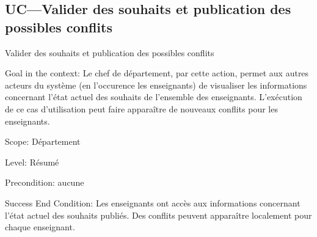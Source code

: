 \begin{ocl}
\begin{comment}
Dans ce scénario, le conflit est réglé par le chef de département qui affecte l'enseignement à un seul des deux enseignants (la demande de l'autre enseignant est alors considérée comme étant refusée).

 \subsubsection{Conflit entre deux enseignants - résolution par un des enseignants}
 \begin{figure}[!htbp]
 \begin{center}
 \texttt{[image: fig/scenario2.jpg]}
 \caption{Scénario : conflit entre deux enseignants - résolution par un des enseignants}
 \end{center}
 \end{figure}

 Dans ce scénario, le conflit est réglé par un des deux enseignants qui annule son vœu concernant l'enseignement à l'origine du conflit.  

\end{comment}

\subsection{UC---Valider des souhaits et publication des possibles conflits}

\begin{usecase}{Valider des souhaits et publication des possibles conflits}
\label{usecase:publier}
\begin{information}
	
\item[{Goal in the context:}]
 Le chef de département, par cette action, permet aux autres acteurs du système (en l'occurence les enseignants) de visualiser les informations concernant l'état actuel des souhaits de l'ensemble des enseignants. 
L'exécution de ce cas d'utilisation peut faire apparaître de nouveaux conflits pour les enseignants.

\item[Scope:] Département

 \item[{Level:}] Résumé

 \item[Precondition:] aucune

 \item[{Success End Condition:}]
Les enseignants ont accès aux informations concernant l'état actuel des souhaits publiés. 
Des conflits peuvent apparaître localement pour chaque enseignant.


\end{information}
\end{usecase}
\end{ocl}
